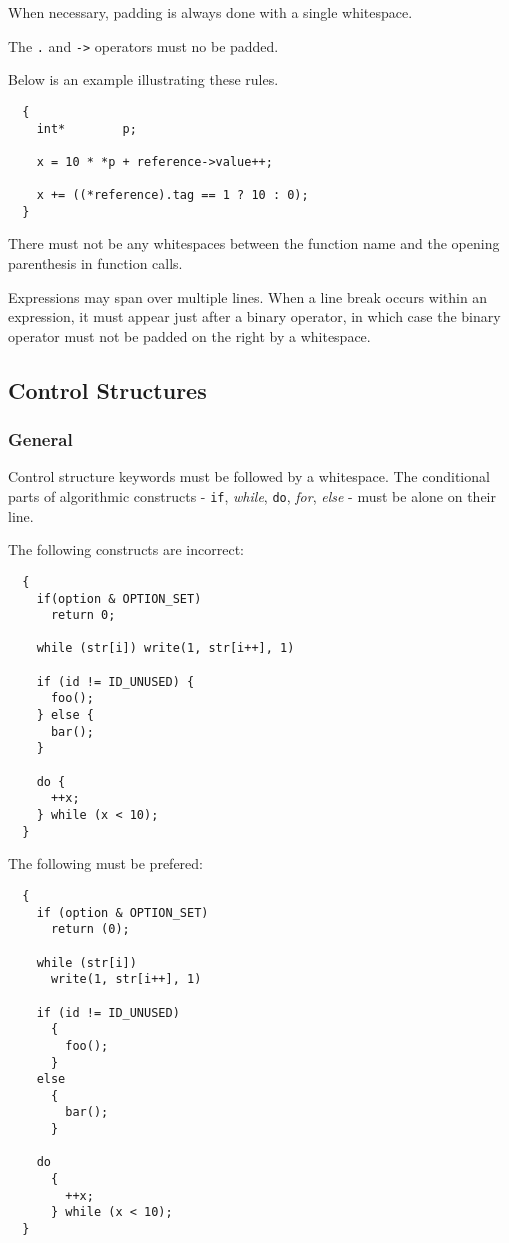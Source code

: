 When necessary, padding is always done with a single whitespace.

The \verb|.| and \verb|->| operators must no be padded.

Below is an example illustrating these rules.

\begin{verbatim}
  {
    int*        p;

    x = 10 * *p + reference->value++;

    x += ((*reference).tag == 1 ? 10 : 0);
  }
\end{verbatim}

There must not be any whitespaces between the function name and the opening
parenthesis in function calls.

Expressions may span over multiple lines. When a line break occurs within
an expression, it must appear just after a binary operator, in which case the
binary operator must not be padded on the right by a whitespace.

%
%

\subsection{Control Structures}


\subsubsection{General}

Control structure keywords must be followed by a whitespace. The conditional
parts of algorithmic constructs - \texttt{if}, \textit{while}, \texttt{do},
\textit{for}, \textit{else} - must be alone on their line.

The following constructs are incorrect:

\begin{verbatim}
  {
    if(option & OPTION_SET)
      return 0;

    while (str[i]) write(1, str[i++], 1)

    if (id != ID_UNUSED) {
      foo();
    } else {
      bar();
    }

    do {
      ++x;
    } while (x < 10);
  }
\end{verbatim}

The following must be prefered:

\begin{verbatim}
  {
    if (option & OPTION_SET)
      return (0);

    while (str[i])
      write(1, str[i++], 1)

    if (id != ID_UNUSED)
      {
        foo();
      }
    else
      {
        bar();
      }

    do
      {
        ++x;
      } while (x < 10);
  }
\end{verbatim}

